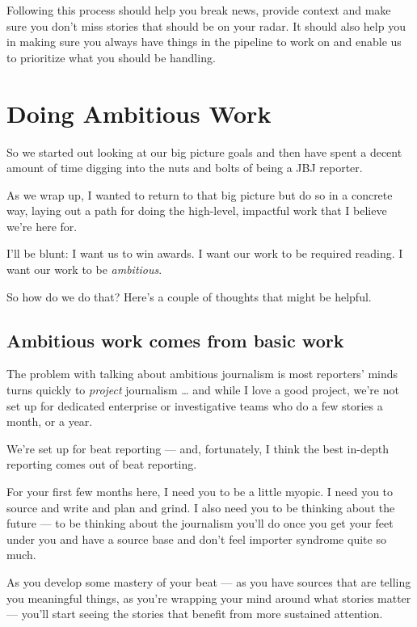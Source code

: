\documentclass[
  11pt,
  american,
  letterpaperpaper,
  extrafontsizes,onecolumn,openright
  ]{memoir}
\begin{document}
Following this process should help you break news, provide context and make sure you don't miss stories that should be on your radar. It should also help you in making sure you always have things in the pipeline to work on and enable us to prioritize what you should be handling.

\hypertarget{doing-ambitious-work}{%
\chapter{Doing Ambitious Work}\label{doing-ambitious-work}}

So we started out looking at our big picture goals and then have spent a decent amount of time digging into the nuts and bolts of being a JBJ reporter.

As we wrap up, I wanted to return to that big picture but do so in a concrete way, laying out a path for doing the high-level, impactful work that I believe we're here for.

I'll be blunt: I want us to win awards. I want our work to be required reading. I want our work to be \emph{ambitious}.

So how do we do that? Here's a couple of thoughts that might be helpful.

\hypertarget{ambitious-work-comes-from-basic-work}{%
\section*{Ambitious work comes from basic work}\label{ambitious-work-comes-from-basic-work}}

The problem with talking about ambitious journalism is most reporters' minds turns quickly to \emph{project} journalism \ldots{} and while I love a good project, we're not set up for dedicated enterprise or investigative teams who do a few stories a month, or a year.

We're set up for beat reporting --- and, fortunately, I think the best in-depth reporting comes out of beat reporting.

For your first few months here, I need you to be a little myopic. I need you to source and write and plan and grind. I also need you to be thinking about the future --- to be thinking about the journalism you'll do once you get your feet under you and have a source base and don't feel importer syndrome quite so much.

As you develop some mastery of your beat --- as you have sources that are telling you meaningful things, as you're wrapping your mind around what stories matter --- you'll start seeing the stories that benefit from more sustained attention.
\end{document}

